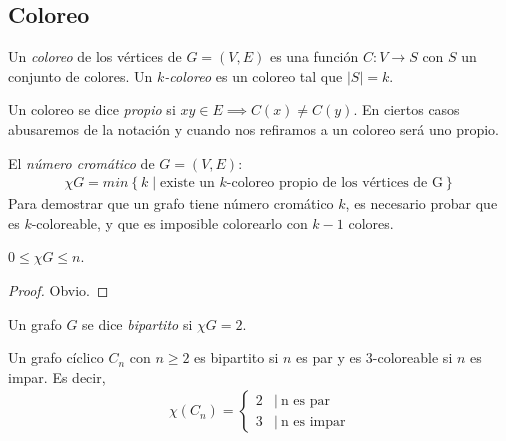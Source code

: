 \subsection{Coloreo}

\begin{definition}
  Un \emph{coloreo} de los vértices de $G = (V,E)$ es una función
  $C \colon V \to S$ con $S$ un conjunto de colores. Un \emph{$k$-coloreo} es
  un coloreo tal que $|S| = k$.
\end{definition}

\begin{definition}
Un coloreo se dice \emph{propio} si $xy \in E \implies C(x) \neq C(y)$. En ciertos casos abusaremos de la notación y cuando nos refiramos a un coloreo será uno propio.
\end{definition}

\begin{definition}
El \emph{número cromático} de $G = (V,E)$:
\begin{align}
    \chi{G} = min\left\{k \mid \text{existe un $k$-coloreo propio de los vértices de G}\right\}
\end{align}
Para demostrar que un grafo tiene número cromático $k$, es necesario probar que es $k$-coloreable, y que es imposible colorearlo con $k-1$ colores.
\end{definition}

\begin{proposition}
$0 \le \chi{G}\le n$.
\end{proposition}
\begin{proof}
Obvio.
\end{proof}

\begin{definition}
Un grafo $G$ se dice \emph{bipartito} si $\chi{G} = 2$.
\end{definition}

\begin{proposition}\label{graph_cyclic_color}
Un grafo cíclico $C_n$ con $n \ge 2$ es bipartito si $n$ es par y es $3$-coloreable si $n$ es impar. Es decir,
\begin{align}
    \chi(C_n) = 
    \begin{cases}
                2 & |\ \text{n es par} \\
                3 & |\ \text{n es impar}
    \end{cases}
\end{align}
\end{proposition}

